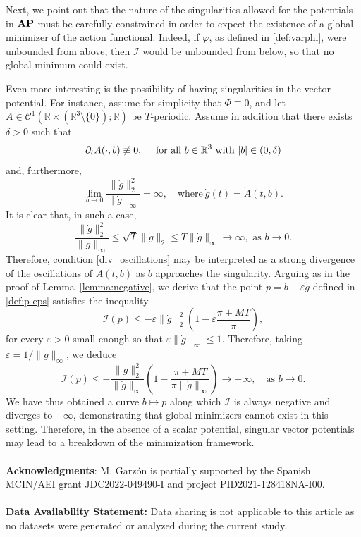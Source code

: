 \documentclass{article}
\newcommand{\boC}{\mathcal{C}}
\newcommand{\boI}{\mathcal{I}}
\newcommand{\R}{\mathbb{R}}
\newcommand{\AP}{\textnormal{\textbf{AP}}}
\theoremstyle{definition}
\begin{document}
Next, we point out that the nature of the singularities allowed for the potentials in $\AP$ must be carefully constrained in order to expect the existence of a global minimizer of the action functional. Indeed, if $\varphi$, as defined in \eqref{def:varphi}, were unbounded from above, then $\boI$ would be unbounded from below, so that no global minimum could exist. 

Even more interesting is the possibility of having singularities in the vector potential. For instance, assume for simplicity that $\Phi\equiv 0$, and let $A\in\boC^1(\R\times(\R^3\setminus\{0\});\R)$ be $T$-periodic. Assume in addition that there exists $\delta>0$ such that
\[\partial_t A(\cdot,b)\not\equiv 0,\quad\text{ for all }b\in \R^3\hbox{ with }|b|\in(0,\delta)\]
and, furthermore,
\begin{equation}\label{div_oscillations}
\lim_{b\to 0}\frac{\|\dot g\|^2_2}{\|\dot g\|_\infty}=\infty,\quad\text{where}\ \dot g(t)=\tilde A(t,b).
\end{equation}
It is clear that, in such a case,
\[\frac{\|\dot g\|^2_2}{\|\dot g\|_\infty}\leq \sqrt{T}\|\dot g\|_2\leq T\|\dot g\|_\infty\to \infty,\text{ as }b\to 0.\]
Therefore, condition \eqref{div_oscillations} may be interpreted as a strong divergence of the oscillations of $A(t,b)$ as $b$ approaches the singularity. Arguing as in the proof of Lemma~\ref{lemma:negative}, we derive that the point $p=b-\varepsilon\tilde g$ defined in \eqref{def:p-eps} 
satisfies the inequality
\[\boI(p)\leq -\varepsilon \|\dot g\|_2^2\left(1-\varepsilon\frac{\pi+MT}{\pi}\right),\]
for every $\varepsilon>0$ small enough so that
$\varepsilon\|\dot g\|_\infty\leq 1.$ Therefore, taking $\varepsilon=1/\|\dot g\|_\infty$, we deduce
\[\boI(p)\leq -\frac{\|\dot g\|_2^2}{\|\dot g\|_\infty}\left(1-\frac{\pi+MT}{\pi \|\dot g\|_\infty}\right)\to-\infty,\quad\text{as }b\to 0.\]
We have thus obtained a curve $b\mapsto p$ along which $\boI$ is always negative and diverges to $-\infty$, demonstrating that global minimizers cannot exist in this setting. Therefore, in the absence of a scalar potential, singular vector potentials may lead to a breakdown of the minimization framework. 
\\\\
{\bf Acknowledgments}: M. Garzón is partially supported by the Spanish MCIN/AEI grant JDC2022-049490-I and project PID2021-128418NA-I00.
\\\\
{\bf Data Availability Statement:} Data sharing is not applicable to this article as no datasets were generated or analyzed during the current study.
\end{document}

